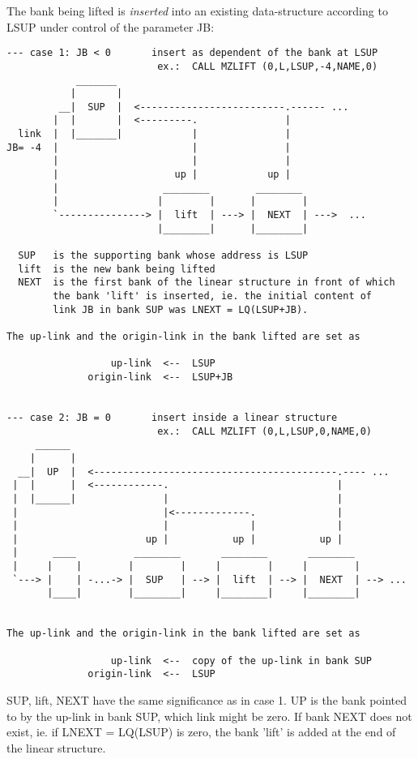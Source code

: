 The bank being lifted is
{\em inserted}
into an existing data-structure according to LSUP
under control of the parameter JB:

\begin{verbatim}
--- case 1: JB < 0       insert as dependent of the bank at LSUP
                          ex.:  CALL MZLIFT (0,L,LSUP,-4,NAME,0)
            _______
           |       |
         __|  SUP  |  <-------------------------.------ ...
        |  |       |  <---------.               |
  link  |  |_______|            |               |
JB= -4  |                       |               |
        |                       |               |
        |                    up |            up |
        |                  ________        ________
        |                 |        |      |        |
        `---------------> |  lift  | ---> |  NEXT  | --->  ...
                          |________|      |________|

  SUP   is the supporting bank whose address is LSUP
  lift  is the new bank being lifted
  NEXT  is the first bank of the linear structure in front of which
        the bank 'lift' is inserted, ie. the initial content of
        link JB in bank SUP was LNEXT = LQ(LSUP+JB).

The up-link and the origin-link in the bank lifted are set as

                  up-link  <--  LSUP
              origin-link  <--  LSUP+JB


--- case 2: JB = 0       insert inside a linear structure
                          ex.:  CALL MZLIFT (0,L,LSUP,0,NAME,0)
     ______
    |      |
  __|  UP  |  <------------------------------------------.---- ...
 |  |      |  <------------.                             |
 |  |______|               |                             |
 |                         |<-------------.              |
 |                         |              |              |
 |                      up |           up |           up |
 |      ____          ________       ________       ________
 |     |    |        |        |     |        |     |        |
 `---> |    | -...-> |  SUP   | --> |  lift  | --> |  NEXT  | --> ...
       |____|        |________|     |________|     |________|


The up-link and the origin-link in the bank lifted are set as

                  up-link  <--  copy of the up-link in bank SUP
              origin-link  <--  LSUP
\end{verbatim} 
SUP, lift, NEXT have the same significance as in case 1.
UP is the bank pointed to by the up-link in bank SUP,
which link might be zero.
If bank NEXT does not exist, ie. if LNEXT = LQ(LSUP) is zero,
the bank 'lift' is added at the end of the linear structure.

